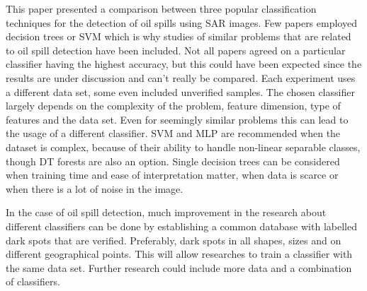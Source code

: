 This paper presented a comparison between three popular classification techniques for the detection of oil spills using SAR images. Few papers employed decision trees or SVM which is why studies of similar problems that are related to oil spill detection have been included. Not all papers agreed on a particular classifier having the highest accuracy, but this could have been expected since the results are under discussion and can't really be compared. Each experiment uses a different data set, some even included unverified samples. The chosen classifier largely depends on the complexity of the problem, feature dimension, type of features and the data set. Even for seemingly similar problems this can lead to the usage of a different classifier. SVM and MLP are recommended when the dataset is complex, because of their ability to handle non-linear separable classes, though DT forests are also an option. Single decision trees can be considered when training time and ease of interpretation matter, when data is scarce or when there is a lot of noise in the image. 

In the case of oil spill detection, much improvement in the research about different classifiers can be done by establishing a common database with labelled dark spots that are verified. Preferably, dark spots in all shapes, sizes and on different geographical points. This will allow researches to train a classifier with the same data set. Further research could include more data and a combination of classifiers.

